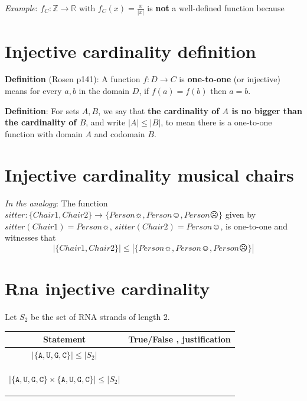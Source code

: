 \documentclass[12pt, oneside]{article}
\newcommand{\A}[0]{\texttt{A}}
\newcommand{\C}[0]{\texttt{C}}
\newcommand{\G}[0]{\texttt{G}}
\newcommand{\U}[0]{\texttt{U}}
\begin{document}
\vfill


{\it Example}: $f_C: \mathbb{Z} \to \mathbb{R}$ with $f_C(x) = \frac{x}{|x|}$ is {\bf not} a well-defined function because \vfill
\section*{Injective cardinality definition}


{\bf Definition}  (Rosen p141): A function $f: D  \to C$ is {\bf one-to-one} (or  injective) means for every $a,b$ in the domain $D$, 
if $f(a) = f(b)$ then  $a=b$.

{\bf Definition}:  For sets $A, B$, we say that  {\bf the  cardinality of $A$ is  no  bigger than the cardinality of  $B$}, and 
write $|A| \leq |B|$, to mean there is a  one-to-one function  with domain $A$  and codomain $B$. \vfill
\section*{Injective cardinality musical chairs}


{\it In the analogy}: The function $sitter: \{ Chair1, Chair2\} \to \{ Person\sun, Person\smiley, Person\frownie \}$ given
by $sitter(Chair1) = Person\sun$,  $sitter(Chair2) = Person\smiley$, is one-to-one and witnesses that 
\[
| \{ Chair1, Chair2\} | \leq |\{ Person\sun, Person\smiley, Person\frownie \}|
\] \vfill
\section*{Rna injective cardinality}


Let $S_2$ be the set of RNA strands of length 2.

\vspace{-20pt}

\begin{center}
\begin{tabular}{|c|p{5in}|}
\hline
Statement  &  True/False , justification \\
\hline
$| \{\A,\U,\G,\C\} | \leq |S_2 |$ &  \\
&\\&\\&\\
\hline
$| \{\A,\U,\G,\C\} \times \{\A, \U, \G,\C\} | \leq |S_2 |$ &  \\
&\\&\\&\\
\hline
\end{tabular}
\end{center} \vfill
\end{document}
